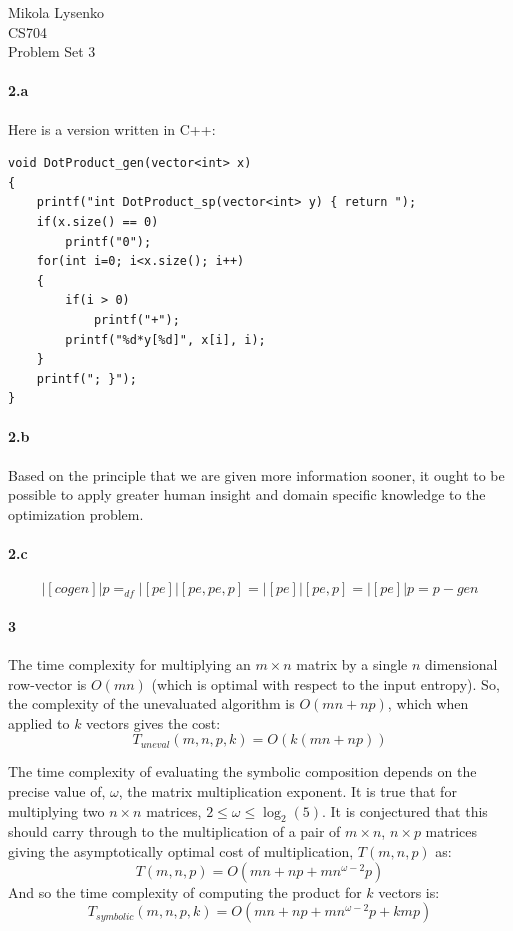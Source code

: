 \documentclass{article}
\begin{document}
\begin{flushright}
Mikola Lysenko \\
CS704 \\
Problem Set 3
\end{flushright}


\paragraph{2.a}
Here is a version written in C++:

\begin{verbatim}
void DotProduct_gen(vector<int> x)
{
    printf("int DotProduct_sp(vector<int> y) { return ");	
    if(x.size() == 0)
        printf("0");
    for(int i=0; i<x.size(); i++)
    {
        if(i > 0)
            printf("+");
        printf("%d*y[%d]", x[i], i); 
    }
    printf("; }");
}
\end{verbatim}

\paragraph{2.b}

Based on the principle that we are given more information sooner, it ought to be possible to apply greater human insight and domain specific knowledge to the optimization problem.

\paragraph{2.c}

\[ |[ cogen ]| p =_{df} |[ pe ]| [pe, pe, p]  = |[ pe ]| [pe, p] = |[pe ]| p = p-gen \]

\paragraph{3}

The time complexity for multiplying an $m \times n$ matrix by a single $n$ dimensional row-vector is $O(mn)$ (which is optimal with respect to the input entropy).  So, the complexity of the unevaluated algorithm is $O(mn + np)$, which when applied to $k$ vectors gives the cost:
\[ T_{uneval}(m, n, p, k) = O(k(mn + np)) \]

The time complexity of evaluating the symbolic composition depends on the precise value of, $\omega$, the matrix multiplication exponent.  It is true that for multiplying two $n \times n$ matrices, $2 \leq \omega \leq \log_2(5)$.  It is conjectured that this should carry through to the multiplication of a pair of $m \times n$, $n \times p$ matrices giving the asymptotically optimal cost of multiplication, $T(m,n,p)$ as:
\[ T(m, n, p) = O( mn + np + m n^{\omega - 2} p) \]
And so the time complexity of computing the product for $k$ vectors is:
\[ T_{symbolic}(m, n, p, k) = O( mn + np + m n^{\omega - 2} p + k m p ) \]
\end{document}
